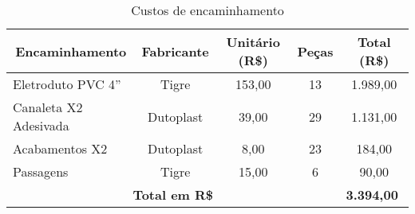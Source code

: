 \begin{table}[h!]
	\begin{center}
		\caption{Custos de encaminhamento}
		\label{tab11}
		\renewcommand{\arraystretch}{1.5}
\begin{tabular}{|l|c|c|c|c|}
	\hline
	\multicolumn{1}{|c|}{\textbf{Encaminhamento}} & \textbf{Fabricante} & \textbf{Unitário (R\$)} & \textbf{Peças} & \textbf{Total (R\$)}                       \\ \hline
	Eletroduto PVC 4”                             & Tigre               &  153,00              & 13             &  1.989,00                               \\ \hline
	Canaleta X2 Adesivada                         & Dutoplast           &  39,00               & 29             &  1.131,00                               \\ \hline
	Acabamentos X2                                & Dutoplast           &  8,00                & 23             & 184,00                                 \\ \hline
	Passagens                                     & Tigre               & 15,00               & 6              &  90,00                                  \\ \hline
	\multicolumn{4}{|c|}{\textbf{Total em R\$}}                                                                           & \multicolumn{1}{l|}{\textbf{ 3.394,00}} \\ \hline
	
\end{tabular}
\end{center}
\end{table}